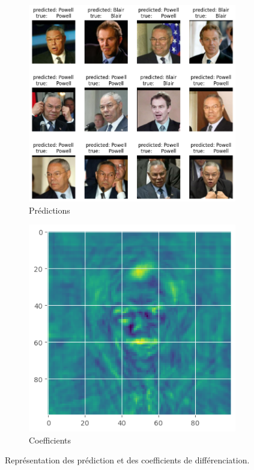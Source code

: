 \documentclass{article}
\begin{document}
\begin{figure}[H]
    \centering
    \captionsetup{justification=centering}
    \begin{subfigure}{0.45\textwidth}
        \centering
        \includegraphics[width=.9\textwidth]{outputs/q4_prediction.png} 
        \caption{Prédictions}
        \label{fig:q4_prediction}
    \end{subfigure}
    \hfill
    \begin{subfigure}{0.45\textwidth}
        \centering
        \includegraphics[width=.8\textwidth]{outputs/q4_coeffs.png}
        \caption{Coefficients}
        \label{fig:q4_coeffs}
    \end{subfigure}
    \caption{Représentation des prédiction et des coefficients de différenciation.}
\end{figure}
\end{document}
